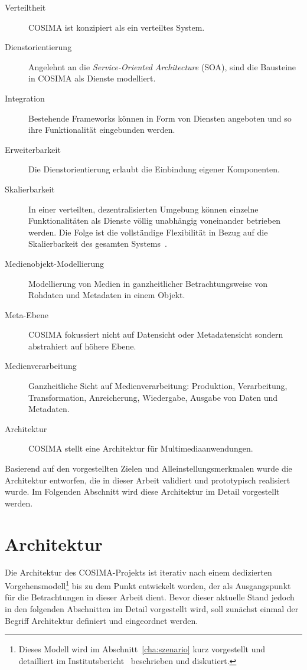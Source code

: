   \begin{description}
    \item[Verteiltheit] COSIMA ist konzipiert als ein verteiltes System.
    \item[Dienstorientierung] Angelehnt an die \emph{Service-Oriented Architecture} (SOA), sind die Bausteine in COSIMA als Dienste modelliert.
    \item[Integration] Bestehende Frameworks können in Form von Diensten angeboten und so ihre Funktionalität eingebunden werden.
    \item[Erweiterbarkeit] Die Dienstorientierung erlaubt die Einbindung eigener Komponenten.
    \item[Skalierbarkeit] In einer verteilten, dezentralisierten Umgebung können einzelne Funktionalitäten als Dienste völlig unabhängig voneinander betrieben werden. Die Folge ist die vollständige Flexibilität in Bezug auf die Skalierbarkeit des gesamten Systems~\citep[S. 294]{web_services_principles_and_technology}.
    \item[Medienobjekt-Modellierung] Modellierung von Medien in ganzheitlicher Betrachtungsweise von Rohdaten und Metadaten in einem Objekt.
    \item[Meta-Ebene] COSIMA fokussiert nicht auf Datensicht oder Metadatensicht sondern abstrahiert auf höhere Ebene.
    \item[Medienverarbeitung] Ganzheitliche Sicht auf Medienverarbeitung: Produktion, Verarbeitung, Transformation, Anreicherung, Wiedergabe, Ausgabe von Daten und Metadaten.
    \item[Architektur] COSIMA stellt eine Architektur für Multimediaanwendungen.
  \end{description}
  
  Basierend auf den vorgestellten Zielen und Alleinstellungsmerkmalen wurde die Architektur entworfen, die in dieser Arbeit validiert und prototypisch realisiert wurde. Im Folgenden Abschnitt wird diese Architektur im Detail vorgestellt werden.


\section{Architektur} %
\label{sec:architektur}

  Die Architektur des COSIMA-Projekts ist iterativ nach einem dedizierten Vorgehensmodell\footnote{Dieses Modell wird im Abschnitt~\ref{cha:szenario} kurz vorgestellt und detailliert im Institutsbericht~\citep[S. 7ff]{bericht} beschrieben und diskutiert.} bis zu dem Punkt entwickelt worden, der als Ausgangspunkt für die Betrachtungen in dieser Arbeit dient. Bevor dieser aktuelle Stand jedoch in den folgenden Abschnitten im Detail vorgestellt wird, soll zunächst einmal der Begriff Architektur definiert und eingeordnet werden.
  
